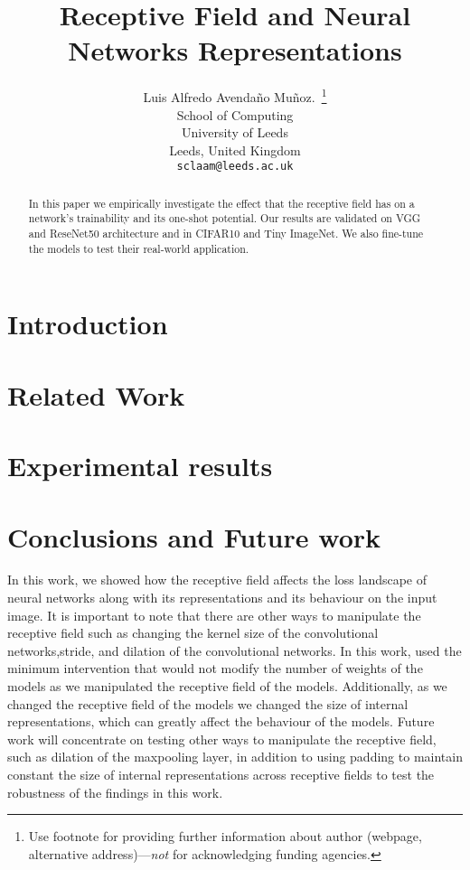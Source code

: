 \documentclass{article}
\title{Receptive Field and Neural Networks Representations}
\author{%
  Luis Alfredo Avendaño Muñoz.~\thanks{Use footnote for providing further information
    about author (webpage, alternative address)---\emph{not} for acknowledging
    funding agencies.} \\
  School of Computing\\
  University of Leeds\\
  Leeds, United Kingdom \\
  \texttt{sclaam@leeds.ac.uk} \\
}
\begin{document}
\maketitle


\begin{abstract}
In this paper we empirically investigate the effect that the receptive field has on a network's trainability and its one-shot potential. Our results are validated on VGG and ReseNet50 architecture and in CIFAR10 and Tiny ImageNet. We also fine-tune the models to test their real-world application.
\end{abstract}

\section{Introduction}

\section{Related Work}

\section{Experimental results}

\section{Conclusions and Future work}
\label{sec:conclusion}



 In this work, we showed how the receptive field affects the loss landscape of neural networks along with its representations and its behaviour on the input image.
It is important to note that there are other ways to manipulate the receptive field such as changing the kernel size of the
convolutional networks,stride, and dilation of the convolutional networks. In this work, used the minimum
intervention that would not modify the number of weights of the models as we manipulated the receptive field of the
models. Additionally, as we changed the receptive field of the models we changed the  size of internal representations,
which can greatly affect the behaviour of the models. Future work will concentrate on testing other ways to manipulate
the receptive field, such as dilation of the maxpooling layer, in addition to using padding to maintain constant the
size
of internal representations across receptive fields to test the robustness of the findings in this work.
\end{document}

